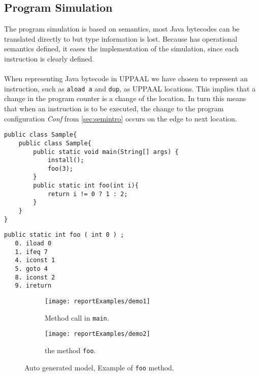 \subsection{Program Simulation}

The program simulation is based on \jcl semantics, most Java bytecodes can be translated directly to \jcl but type information is lost. Because \jcl has operational semantics defined, it eases the implementation of the simulation, since each instruction is clearly defined.\\\\
When representing Java bytecode in UPPAAL we have chosen to represent an instruction, such as \texttt{aload a} and \texttt{dup}, as UPPAAL locations. 
This implies that a change in the program counter is a change of the location. 
In turn this means that when an instruction is to be executed, the change to the program configuration \textit{Conf} from  \cref{sec:semintro} occurs on the edge to next location.

\begin{minipage}{\linewidth}
\begin{lstlisting}[caption=Java code sample.]
public class Sample{
    public class Sample{
        public static void main(String[] args) {
            install();
            foo(3);
        }
        public static int foo(int i){
            return i != 0 ? 1 : 2;
        }
    }
}
\end{lstlisting}
\end{minipage}
\begin{minipage}{\linewidth}
\begin{lstlisting}[caption=Bytecode sample.]
public static int foo ( int 0 ) ;
   0. iload 0
   1. ifeq 7
   4. iconst 1
   5. goto 4
   8. iconst 2
   9. ireturn
\end{lstlisting}
\end{minipage}

\begin{figure}
\begin{subfigure}{\textwidth}
	\texttt{[image: reportExamples/demo1]}
	\caption{Method call in \texttt{main}.}
\end{subfigure}
\begin{subfigure}{\textwidth}
	\texttt{[image: reportExamples/demo2]}
	\caption{the method \texttt{foo}.}

\end{subfigure}

\caption{Auto generated model, Example of \texttt{foo} method.}
\label{fig:fooMethod}
\end{figure}


